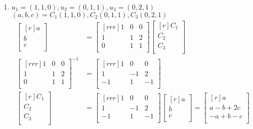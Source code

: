\documentclass[12pt]{article}
\begin{document}
\begin{enumerate}
\begin{enumerate}
	\item $u_1=(1,1,0),u_2=(0,1,1),u_3=(0,2,1)$\\
	$(a,b,c)=C_1(1,1,0),C_2(0,1,1),C_3(0,2,1)$\\
	\begin{align*}
	\begin{bmatrix}[r] a\\b\\c\\ \end{bmatrix} &=
	\begin{bmatrix}[rrr] 1&0&0\\1&1&2\\0&1&1\\ \end{bmatrix}
	\begin{bmatrix}[r] C_1\\C_2\\C_3\\ \end{bmatrix}\\
	\begin{bmatrix}[rrr] 1&0&0\\1&1&2\\0&1&1\\ \end{bmatrix}^{-1}
	 &= \begin{bmatrix}[rrr] 1&0&0\\1&-1&2\\-1&1&-1\\ \end{bmatrix}\\
	\begin{bmatrix}[r] C_1\\C_2\\C_3\\ \end{bmatrix} &=
	\begin{bmatrix}[rrr] 1&0&0\\1&-1&2\\-1&1&-1\\ \end{bmatrix}
	\begin{bmatrix}[r] a\\b\\c\\ \end{bmatrix}
	= \begin{bmatrix}[r] a\\ a-b+2c\\ -a+b-c\\ \end{bmatrix}
	\end{align*}
	

\end{enumerate}
\end{enumerate}
\end{document}
